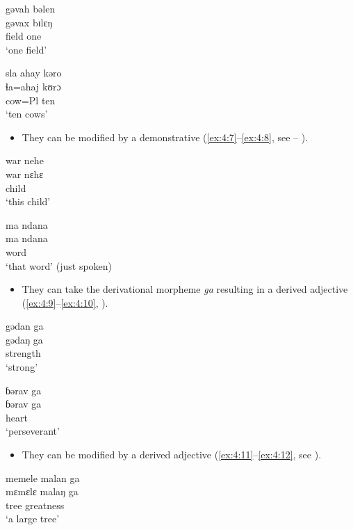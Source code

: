 \ea \label{ex:4:5}
gəvah  bəlen\\
\gll  gəvax  bɪlɛŋ\\
      field  one\\
\glt  ‘one field’
\z

\ea \label{ex:4:6}
sla  ahay  kəro\\
\gll  ɬa=ahaj  kʊrɔ\\
      cow=Pl  ten\\
\glt  ‘ten cows’
\z

\begin{itemize}
\item They can be modified by a demonstrative (\ref{ex:4:7}--\ref{ex:4:8}, see -- ).
\end{itemize}

\ea \label{ex:4:7}
war  nehe\\
\gll  war    nɛhɛ\\
      child  {\DEM}\\
\glt  ‘this child’
\z

\ea \label{ex:4:8}
ma    ndana\\
\gll  ma    ndana\\
      word  {\DEM}\\
\glt  ‘that word’ (just spoken)
\z

\begin{itemize}
\item They can take the derivational morpheme \textit{ga}  resulting in a derived adjective (\ref{ex:4:9}--\ref{ex:4:10}, ).
\end{itemize}

\ea \label{ex:4:9}
gədan  ga\\
\gll  gədaŋ  ga\\
      strength  {\ADJ}\\
\glt  ‘strong’
\z

\ea \label{ex:4:10}
ɓərav    ga\\
\gll  ɓərav    ga\\
     heart  {\ADJ}\\
\glt  ‘perseverant’
\z

\begin{itemize}
\item They can be modified by a derived adjective (\ref{ex:4:11}--\ref{ex:4:12}, see ).
\end{itemize}

\ea \label{ex:4:11}
memele  malan  ga\\
\gll  mɛmɛlɛ  malaŋ    ga\\
      tree    greatness  {\ADJ}\\
\glt  ‘a large tree’
\z

